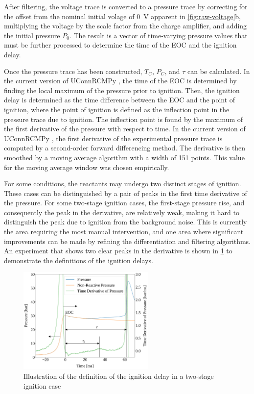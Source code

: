 \documentclass[12pt]{../ussci}
\begin{document}
After filtering, the voltage trace is converted to a pressure trace by
correcting for the offset from the nominal initial volage of \SI{0}{\V} apparent
in \mbox{\cref{fig:raw-voltage}b}, multiplying the voltage by the scale factor
from the charge amplifier, and adding the initial pressure \(P_0\). The result
is a vector of time-varying pressure values that must be further processed to
determine the time of the EOC and the ignition delay.

Once the pressure trace has been constructed, \(T_C\), \(P_C\), and \(\tau\) can
be calculated. In the current version of UConnRCMPy \autocite{uconnrcmpy}, the
time of the EOC is determined by finding the local maximum of the pressure prior
to ignition. Then, the ignition delay is determined as the time difference
between the EOC and the point of ignition, where the point of ignition is
defined as the inflection point in the pressure trace due to ignition. The
inflection point is found by the maximum of the first derivative of the pressure
with respect to time. In the current version of UConnRCMPy
\autocite{uconnrcmpy}, the first derivative of the experimental pressure trace
is computed by a second-order forward differencing method. The derivative is
then smoothed by a moving average algorithm with a width of 151 points. This
value for the moving average window was chosen empirically.

For some conditions, the reactants may undergo two distinct stages of
ignition. These cases can be distinguished by a pair of peaks in the
first time derivative of the pressure. For some two-stage ignition
cases, the first-stage pressure rise, and consequently the peak in the
derivative, are relatively weak, making it hard to distinguish the peak
due to ignition from the background noise. This is currently the area
requiring the most manual intervention, and one area where significant
improvements can be made by refining the differentiation and
filtering algorithms. An experiment that shows two clear peaks
in the derivative is shown in \cref{fig:ign-delay-def} to
demonstrate the definitions of the ignition delays.

\begin{figure}[htbp]
    \centering
    \includegraphics[width=0.6\textwidth]{figures/ign-delay-def.pdf}
    \caption{Illustration of the definition of the ignition delay in a
    two-stage ignition case}
    \label{fig:ign-delay-def}
\end{figure}
\end{document}
